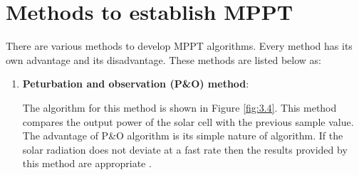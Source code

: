 \documentclass[a4paper,12pt]{iitmdiss}
\begin{document}
\section{Methods to establish MPPT}
There are various methods to develop MPPT algorithms. Every method has its own advantage and its disadvantage. These methods are listed below as:

\begin{enumerate}
    \item \textbf{Peturbation and observation (P\&O) method}:
    
    The algorithm for this method is shown in Figure \ref{fig:3.4}. This method compares the output power of the solar cell with the previous sample value. The advantage of P\&O algorithm is its simple nature of algorithm. If the solar radiation does not deviate at a fast rate then the results provided by this method are appropriate \textcolor{blue}{\cite{al2018review}}.
    

\end{enumerate}
\end{document}
